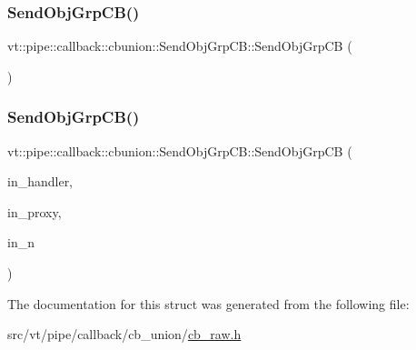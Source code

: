 \subsubsection{\texorpdfstring{Send\+Obj\+Grp\+C\+B()}{SendObjGrpCB()}\hspace{0.1cm}{\footnotesize\ttfamily [1/2]}}
{\footnotesize\ttfamily vt\+::pipe\+::callback\+::cbunion\+::\+Send\+Obj\+Grp\+C\+B\+::\+Send\+Obj\+Grp\+CB (\begin{DoxyParamCaption}{ }\end{DoxyParamCaption})\hspace{0.3cm}{\ttfamily [default]}}

\mbox{\label{structvt_1_1pipe_1_1callback_1_1cbunion_1_1_send_obj_grp_c_b_acc592625e093ec290d33cf7d6e32dead}} 
\subsubsection{\texorpdfstring{Send\+Obj\+Grp\+C\+B()}{SendObjGrpCB()}\hspace{0.1cm}{\footnotesize\ttfamily [2/2]}}
{\footnotesize\ttfamily vt\+::pipe\+::callback\+::cbunion\+::\+Send\+Obj\+Grp\+C\+B\+::\+Send\+Obj\+Grp\+CB (\begin{DoxyParamCaption}\item[{\hyperlink{namespacevt_af64846b57dfcaf104da3ef6967917573}{Handler\+Type}}]{in\+\_\+handler,  }\item[{\hyperlink{namespacevt_ad7cae989df485fccca57f0792a880a8e}{Obj\+Group\+Proxy\+Type}}]{in\+\_\+proxy,  }\item[{\hyperlink{namespacevt_a866da9d0efc19c0a1ce79e9e492f47e2}{Node\+Type}}]{in\+\_\+n }\end{DoxyParamCaption})\hspace{0.3cm}{\ttfamily [inline]}}



The documentation for this struct was generated from the following file\+:\begin{DoxyCompactItemize}
\item 
src/vt/pipe/callback/cb\+\_\+union/\hyperlink{cb__raw_8h}{cb\+\_\+raw.\+h}\end{DoxyCompactItemize}
